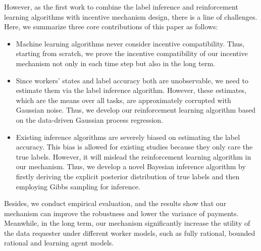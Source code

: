 
However, as the first work to combine the label inference and reinforcement learning algorithms with incentive mechanism design, there is a line of challenges. Here, we summarize three core contributions of this paper as follows:
\begin{itemize}
\item Machine learning algorithms never consider incentive compatibility. Thus, starting from scratch, we prove the incentive compatibility of our incentive mechanism not only in each time step but also in the long term.
\item Since workers' states and label accuracy both are unobservable, we need to estimate them via the label inference algorithm. However, these estimates, which are the means over all tasks, are approximately corrupted with Gaussian noise. Thus, we develop our reinforcement learning algorithm based on the data-driven Gaussian process regression.
\item Existing inference algorithms are severely biased on estimating the label accuracy. This bias is allowed for existing studies because they only care the true labels. However, it will mislead the reinforcement learning algorithm in our mechanism. Thus, we develop a novel Bayesian inference algorithm by firstly deriving the explicit posterior distribution of true labels and then employing Gibbs sampling for inference.
%
%
%
\end{itemize}
Besides, we conduct empirical evaluation, and the results show that our mechanism can improve the robustness and lower the variance of payments.
Meanwhile, in the long term, our mechanism significantly increase the utility of the data requester under different worker models, such as fully rational, bounded rational and learning agent models. 

